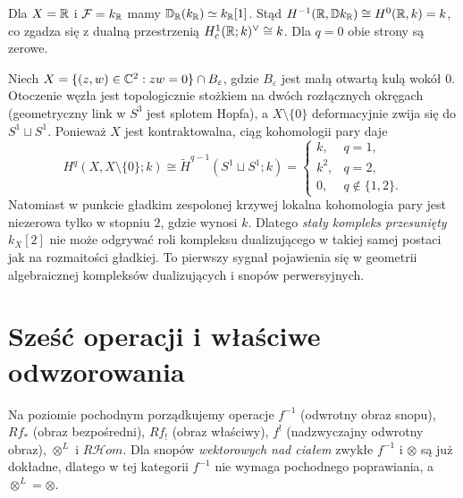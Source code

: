 \begin{przyklad}
Dla $X=\mathbb{R}$ i $\mathcal F=k_{\mathbb{R}}$ mamy
$\mathbb D_{\mathbb{R}}(k_{\mathbb{R}})\simeq k_{\mathbb{R}}[1]$.
Stąd $H^{-1}(\mathbb{R},\mathbb D k_{\mathbb{R}})\cong H^0(\mathbb{R},k)=k$,
co zgadza się z dualną przestrzenią
$H_c^1(\mathbb{R};k)^\vee\cong k$.
Dla $q=0$ obie strony są zerowe.
\end{przyklad}

\begin{przyklad}
\label{ex:node-duality-v12}
Niech $X=\{(z,w)\in\mathbb{C}^2:zw=0\}\cap B_\varepsilon$,
gdzie $B_\varepsilon$ jest małą otwartą kulą wokół $0$.
Otoczenie węzła jest topologicznie stożkiem na
dwóch rozłącznych okręgach (geometryczny link w $S^3$
jest splotem Hopfa), a $X\setminus\{0\}$ deformacyjnie zwija się
do $S^1\sqcup S^1$. Ponieważ $X$ jest kontraktowalna,
ciąg kohomologii pary daje
\[
H^q(X,X\setminus\{0\};k)\cong
\widetilde H^{q-1}(S^1\sqcup S^1;k)
=\begin{cases}
k,&q=1,\\k^2,&q=2,\\0,&q\notin\{1,2\}.
\end{cases}
\]
Natomiast w punkcie gładkim zespolonej krzywej
lokalna kohomologia pary jest niezerowa tylko w stopniu $2$,
gdzie wynosi $k$. Dlatego \emph{stały kompleks przesunięty}
$k_X[2]$ nie może odgrywać roli kompleksu dualizującego
w takiej samej postaci jak na rozmaitości gładkiej.
To pierwszy sygnał pojawienia się w geometrii
algebraicznej kompleksów dualizujących i snopów perwersyjnych.
\end{przyklad}

\section{Sześć operacji i właściwe odwzorowania}
Na poziomie pochodnym porządkujemy operacje
$f^{-1}$ (odwrotny obraz snopu), $Rf_*$ (obraz bezpośredni),
$Rf_!$ (obraz właściwy), $f^!$ (nadzwyczajny odwrotny obraz),
$\otimes^L$ i $R\mathcal Hom$.
Dla snopów \emph{wektorowych nad ciałem} zwykłe $f^{-1}$
i $\otimes$ są już dokładne, dlatego w tej kategorii $f^{-1}$ nie wymaga
pochodnego poprawiania, a $\otimes^L=\otimes$.

